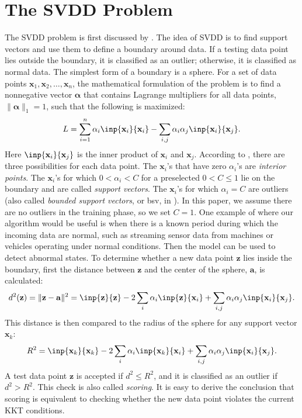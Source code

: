 \documentclass{article}
\numberwithin{equation}{section}
\begin{document}
\section{The SVDD Problem}\label{svddprob}
The SVDD problem is first discussed by \citet{tax2004support}. The idea of SVDD is to find support vectors and use them to define a boundary around data. If a testing data point lies outside the boundary, it is classified as an outlier; otherwise, it is classified as normal data. The simplest form of a boundary is a sphere. For a set of data points $\mathbf{x}_1, \mathbf{x}_2, \ldots, \mathbf{x}_n$, the mathematical formulation of the problem is to find a nonnegative vector $\boldsymbol{\alpha}$ that contains Lagrange multipliers for all data points, $\|\boldsymbol{\alpha}\|_1=1$, such that the following is maximized:
\begin{equation}\label{spheredual}
L=\sum_{i=1}^{n}\alpha_{i}\inp{\mathbf{x}_{i}}{\mathbf{x}_{i}}-\sum_{i,j}\alpha_{i}\alpha _{j}\inp{\mathbf{x}_{i}}{\mathbf{x}_{j}}.
\end{equation}
Here $\inp{\mathbf{x}_{i}}{\mathbf{x}_{j}}$ is the inner product of $\mathbf{x}_i$ and $\mathbf{x}_j$. According to \citet{tax2004support}, there are three possibilities for each data point. The $\mathbf{x}_i$'s that have zero $\alpha_i$'s are \textit{interior points}. The $\mathbf{x}_i$'s for which $0<\alpha_i<C$ for a preselected $0<C\le1$ lie on the boundary and are called \textit{support vectors}. The $\mathbf{x}_i$'s for which $\alpha_i=C$ are outliers (also called \textit{bounded support vectors}, or bsv, in \citet{ben2001support}). In this paper, we assume there are no outliers in the training phase, so we set $C=1$. One example of where our algorithm would be useful is when there is a known period during which the incoming data are normal, such as streaming sensor data from machines or vehicles operating under normal conditions. Then the model can be used to detect abnormal states. To determine whether a new data point $\mathbf{z}$ lies inside the boundary, first the distance between $\mathbf{z}$ and the center of the sphere, $\mathbf{a}$, is calculated:
\begin{equation}\label{d^2orig}
d^2(\mathbf{z})=\|\mathbf{z}-\mathbf{a}\|^2 = \inp{\mathbf{z}}{\mathbf{z}} \\ 
-2\sum_i\alpha_i\inp{\mathbf{z}}{\mathbf{x}_i}+\sum_{i,j}\alpha_i\alpha_j\inp{\mathbf{x}_i}{\mathbf{x}_j}.
\end{equation}
This distance is then compared to the radius of the sphere for any support vector $\mathbf{x}_k$:
\begin{equation}\label{r^2orig}
R^2 = \inp{\mathbf{x}_k}{\mathbf{x}_k} \\ 
-2\sum_i\alpha_i\inp{\mathbf{x}_k}{\mathbf{x}_i}+\sum_{i,j}\alpha_i\alpha_j\inp{\mathbf{x}_i}{\mathbf{x}_j}.
\end{equation}
A test data point $\mathbf{z}$ is accepted if $d^2\le R^2$, and it is classified as an outlier if $d^2> R^2$. This check is also called \textit{scoring}. It is easy to derive the conclusion that scoring is equivalent to checking whether the new data point violates the current KKT conditions.  
\end{document}
